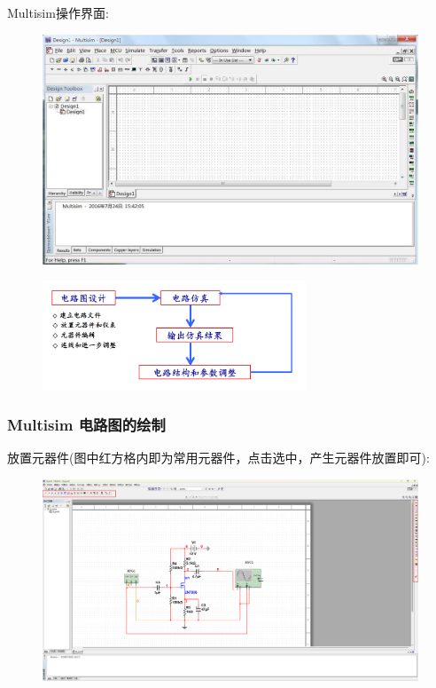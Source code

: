 \documentclass[a4paper,11pt,UTF8]{article}
\numberwithin{equation}{subsection}
\begin{document}
Multisim操作界面:
\begin{figure}[H]
	\centering
	\includegraphics[width=1\textwidth]{MULTISIM}	
\end{figure}

\begin{figure}[H]
	\centering
	\includegraphics[width=0.7\textwidth]{step}	
\end{figure}
\subsubsection{Multisim 电路图的绘制}
放置元器件(图中红方格内即为常用元器件，点击选中，产生元器件放置即可):
\begin{figure}[H]
	\centering
	\includegraphics[width=1\textwidth]{5.2.2_1}	
\end{figure}
\end{document}
